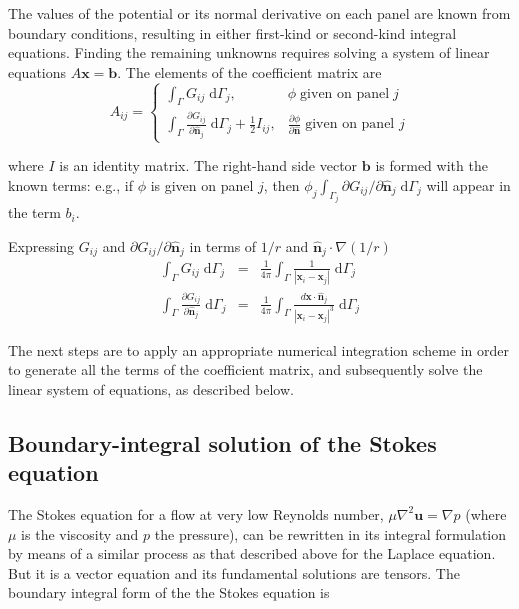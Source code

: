 \documentclass[smallcondensed,final]{svjour3}
\newcommand{\di}[1]{\text{d}#1}
\newcommand{\partiald}[2]{\frac{\partial #1}{\partial #2}}
\newcommand{\partialdi}[2]{\partial #1 / \partial #2}
\newcommand{\vect}[1]{\mathbf{#1}}
\newcommand{\nhat}{\hat{\mathbf{n}}}
\begin{document}
The values of the potential or its normal derivative on each panel are known from boundary conditions, resulting in either first-kind or second-kind integral equations. Finding the remaining unknowns requires solving a system of linear equations $A\vect{x}=\vect{b}$. The elements of the coefficient matrix are
%
\begin{equation} \label{eqn:laplace_matrix}
	A_{ij} = 
	\begin{cases}
		\int_{\Gamma} G_{ij}\;\di{\Gamma_j}, & \phi\;\text{given on panel}\;j \\
		\int_{\Gamma} \partiald{G_{ij}}{\nhat_j}\;\di{\Gamma_j} + \frac{1}{2} I_{ij}, & \partiald{\phi}{\nhat}\;\text{given on panel } j
	\end{cases}
\end{equation}

\noindent
where $I$ is an identity matrix. The right-hand side vector $\vect{b}$ is formed with the known terms: e.g., if $\phi$ is given on panel $j$, then $\phi_j\int_{\Gamma_j}\partialdi{G_{ij}}{\nhat_j}\;\di{\Gamma_j}$ will appear in the term $b_i$.

Expressing $G_{ij}$ and $\partialdi{G_{ij}}{\nhat_j}$ in terms of $1/r$ and $\nhat_j\cdot\nabla(1/r)$
%
\begin{eqnarray}
	\label{eqn:laplace_bem_G}\int_{\Gamma} G_{ij}\;\di{\Gamma_j} & = & \frac{1}{4\pi}\int_{\Gamma} \frac{1}{|\vect{x}_i-\vect{x}_j|} \;\di{\Gamma_j} \\ 
	\label{eqn:laplace_bem_dGdn}\int_{\Gamma} \partiald{G_{ij}}{\nhat_j}\;\di{\Gamma_j} & = & \frac{1}{4\pi}\int_{\Gamma}\frac{d\vect{x}\cdot\nhat_j}{|\vect{x}_i-\vect{x}_j|^{3}}\;\di{\Gamma_j}
\end{eqnarray}

The next steps are to apply an appropriate numerical integration scheme in order to generate all the terms of the coefficient matrix, and subsequently solve the linear system of equations, as described below.

\subsection{Boundary-integral solution of the Stokes equation}

The Stokes equation for a flow at very low Reynolds number, $\mu\nabla^{2}\vect{u} =  \nabla p$ (where $\mu$ is the viscosity and $p$ the pressure), can be rewritten in its integral formulation by means of a similar process as that described above for the Laplace equation. But it is a vector equation and its fundamental solutions are tensors. The boundary integral form of the the Stokes equation is
\end{document}
